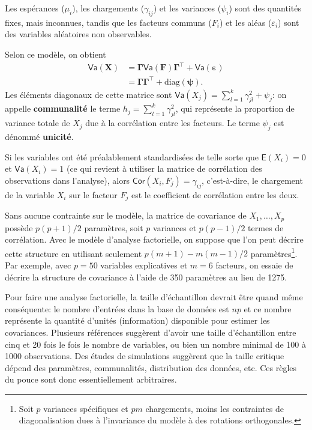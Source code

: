 \documentclass[
  11pt,
  letterpaper,
]{scrbook}
\theoremstyle{definition}
\theoremstyle{remark}
\begin{document}
Les espérances (\(\mu_i\)), les chargements (\(\gamma_{ij}\)) et les
variances (\(\psi_i\)) sont des quantités fixes, mais inconnues, tandis
que les facteurs communs (\(F_i\)) et les aléas (\(\varepsilon_i\)) sont
des variables aléatoires non observables.

Selon ce modèle, on obtient \begin{align*}
\mathsf{Va}(\boldsymbol{X}) &= \boldsymbol{\Gamma}\mathsf{Va}(\boldsymbol{F})\boldsymbol{\Gamma}^\top + \mathsf{Va}(\boldsymbol{\varepsilon})\\
& = \boldsymbol{\Gamma}\boldsymbol{\Gamma}^\top + \mathrm{diag}(\boldsymbol{\psi}).
\end{align*} Les éléments diagonaux de cette matrice sont
\(\mathsf{Va}(X_j) = \sum_{l=1}^k \gamma_{jl}^2 + \psi_j\): on appelle
\textbf{communalité} le terme \(h_j = \sum_{l=1}^k \gamma_{jl}^2\), qui
représente la proportion de variance totale de \(X_j\) due à la
corrélation entre les facteurs. Le terme \(\psi_j\) est dénommé
\textbf{unicité}.

Si les variables ont été préalablement standardisées de telle sorte que
\(\mathsf{E}(X_i)=0\) et \(\mathsf{Va}(X_i)=1\) (ce qui revient à
utiliser la matrice de corrélation des observations dans l'analyse),
alors \(\mathsf{Cor}(X_i, F_j)=\gamma_{ij}\), c'est-à-dire, le
chargement de la variable \(X_i\) sur le facteur \(F_j\) est le
coefficient de corrélation entre les deux.

Sans aucune contrainte sur le modèle, la matrice de covariance de
\(X_1, \ldots, X_p\) possède \(p(p+1)/2\) paramètres, soit \(p\)
variances et \(p(p-1)/2\) termes de corrélation. Avec le modèle
d'analyse factorielle, on suppose que l'on peut décrire cette structure
en utilisant seulement \(p(m+1) - m(m-1)/2\) paramètres\footnote{Soit
  \(p\) variances spécifiques et \(pm\) chargements, moins les
  contraintes de diagonalisation dues à l'invariance du modèle à des
  rotations orthogonales.}. Par exemple, avec \(p=50\) variables
explicatives et \(m=6\) facteurs, on essaie de décrire la structure de
covariance à l'aide de 350 paramètres au lieu de 1275.

Pour faire une analyse factorielle, la taille d'échantillon devrait être
quand même conséquente: le nombre d'entrées dans la base de données est
\(np\) et ce nombre représente la quantité d'unités (information)
disponible pour estimer les covariances. Plusieurs références suggèrent
d'avoir une taille d'échantillon entre cinq et 20 fois le fois le nombre
de variables, ou bien un nombre minimal de 100 à 1000 observations. Des
études de simulations suggèrent que la taille critique dépend des
paramètres, communalités, distribution des données, etc. Ces règles du
pouce sont donc essentiellement arbitraires.
\end{document}
